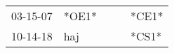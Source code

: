 \begin{supertabular}{p{0.07\textwidth}p{0.06\textwidth}p{0.02\textwidth}p{0.02\textwidth}p{0.06\textwidth}}
 03-15-07\textsuperscript{} &                  *OE1* &   &   &  *CE1* \\
 10-14-18\textsuperscript{} &  haj\textsuperscript{} &   &   &  *CS1* \\
\end{supertabular}
